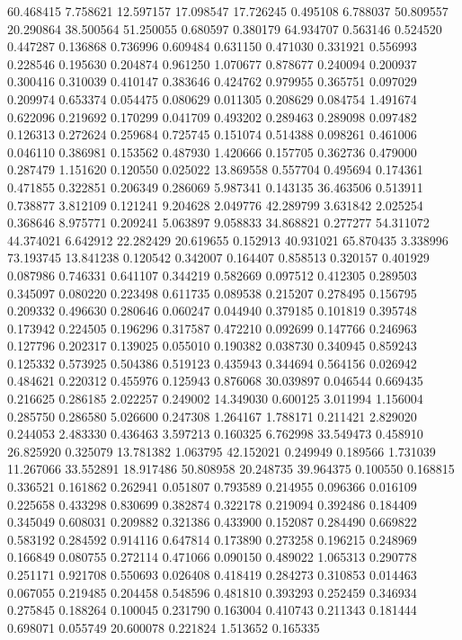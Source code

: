60.468415
7.758621
12.597157
17.098547
17.726245
0.495108
6.788037
50.809557
20.290864
38.500564
51.250055
0.680597
0.380179
64.934707
0.563146
0.524520
0.447287
0.136868
0.736996
0.609484
0.631150
0.471030
0.331921
0.556993
0.228546
0.195630
0.204874
0.961250
1.070677
0.878677
0.240094
0.200937
0.300416
0.310039
0.410147
0.383646
0.424762
0.979955
0.365751
0.097029
0.209974
0.653374
0.054475
0.080629
0.011305
0.208629
0.084754
1.491674
0.622096
0.219692
0.170299
0.041709
0.493202
0.289463
0.289098
0.097482
0.126313
0.272624
0.259684
0.725745
0.151074
0.514388
0.098261
0.461006
0.046110
0.386981
0.153562
0.487930
1.420666
0.157705
0.362736
0.479000
0.287479
1.151620
0.120550
0.025022
13.869558
0.557704
0.495694
0.174361
0.471855
0.322851
0.206349
0.286069
5.987341
0.143135
36.463506
0.513911
0.738877
3.812109
0.121241
9.204628
2.049776
42.289799
3.631842
2.025254
0.368646
8.975771
0.209241
5.063897
9.058833
34.868821
0.277277
54.311072
44.374021
6.642912
22.282429
20.619655
0.152913
40.931021
65.870435
3.338996
73.193745
13.841238
0.120542
0.342007
0.164407
0.858513
0.320157
0.401929
0.087986
0.746331
0.641107
0.344219
0.582669
0.097512
0.412305
0.289503
0.345097
0.080220
0.223498
0.611735
0.089538
0.215207
0.278495
0.156795
0.209332
0.496630
0.280646
0.060247
0.044940
0.379185
0.101819
0.395748
0.173942
0.224505
0.196296
0.317587
0.472210
0.092699
0.147766
0.246963
0.127796
0.202317
0.139025
0.055010
0.190382
0.038730
0.340945
0.859243
0.125332
0.573925
0.504386
0.519123
0.435943
0.344694
0.564156
0.026942
0.484621
0.220312
0.455976
0.125943
0.876068
30.039897
0.046544
0.669435
0.216625
0.286185
2.022257
0.249002
14.349030
0.600125
3.011994
1.156004
0.285750
0.286580
5.026600
0.247308
1.264167
1.788171
0.211421
2.829020
0.244053
2.483330
0.436463
3.597213
0.160325
6.762998
33.549473
0.458910
26.825920
0.325079
13.781382
1.063795
42.152021
0.249949
0.189566
1.731039
11.267066
33.552891
18.917486
50.808958
20.248735
39.964375
0.100550
0.168815
0.336521
0.161862
0.262941
0.051807
0.793589
0.214955
0.096366
0.016109
0.225658
0.433298
0.830699
0.382874
0.322178
0.219094
0.392486
0.184409
0.345049
0.608031
0.209882
0.321386
0.433900
0.152087
0.284490
0.669822
0.583192
0.284592
0.914116
0.647814
0.173890
0.273258
0.196215
0.248969
0.166849
0.080755
0.272114
0.471066
0.090150
0.489022
1.065313
0.290778
0.251171
0.921708
0.550693
0.026408
0.418419
0.284273
0.310853
0.014463
0.067055
0.219485
0.204458
0.548596
0.481810
0.393293
0.252459
0.346934
0.275845
0.188264
0.100045
0.231790
0.163004
0.410743
0.211343
0.181444
0.698071
0.055749
20.600078
0.221824
1.513652
0.165335
